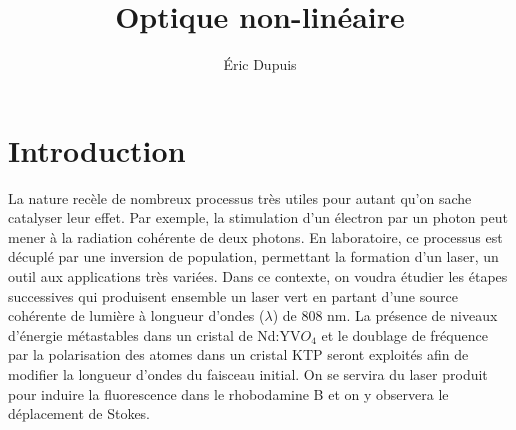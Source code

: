 \documentclass[10pt,letterpaper,twocolumn]{article}
\title{\vspace{-10mm}\Large
Optique non-linéaire
\vspace{-4mm}}
\author{\large
Éric Dupuis\\
}
\date{\vspace{-8mm}}
\begin{document}
\twocolumn[
\maketitle
\begin{onecolabstract}
\noindent La formation d'un laser vert  a été tentée dans le but d'explorer et caractériser plusieurs principes d'optique non-linéaire. Une faisceau avec $\lambda= 1064 \,nm$ a été formé par inversion de population en excitant à 808 nm un cristal de ND:YV$O_4$. La longueur optimale de la cavité optique est de $13.0\pm 0.1 \,cm$. Une augmentation linéaire du rapport de la raie émise (1064 nm) par rapport à la raie d'excitation (808 nm) en fonction de l'intensité du faisceau incident a été observée. Le spectre d'émission spontanée du ND:YV$O_4$ a montré la présence d'autre raies d'émission à 914 et XXX nm. La génération d'une raie à 532 nm avec un cristal de KTP n'a pas été réussie. La fluorescence  dans la rhodanine excitée à 532 nm par un autre laser a montré un déplacement de Stokes de XX nm.
\vspace{4mm} %
\end{onecolabstract}
]

\section{Introduction}\label{intro}
La nature recèle de nombreux processus très utiles pour autant qu'on sache catalyser leur effet.  
Par exemple, la stimulation d'un électron par un photon peut mener à la radiation cohérente de deux photons. En laboratoire, ce processus est décuplé par une inversion de population, permettant la formation d'un laser, un outil aux applications très variées. Dans ce contexte, on voudra étudier les étapes successives qui produisent ensemble un laser vert en partant d'une source cohérente de lumière à longueur d'ondes ($\lambda$) de 808 nm. La présence de niveaux d'énergie métastables dans un cristal de  Nd:YV$O_4$  et le doublage de fréquence par la polarisation des atomes dans un cristal KTP seront exploités afin de modifier la longueur d'ondes du faisceau initial. On se servira du laser produit pour induire la fluorescence dans le rhobodamine B et on y observera le déplacement de Stokes. 
\end{document}
